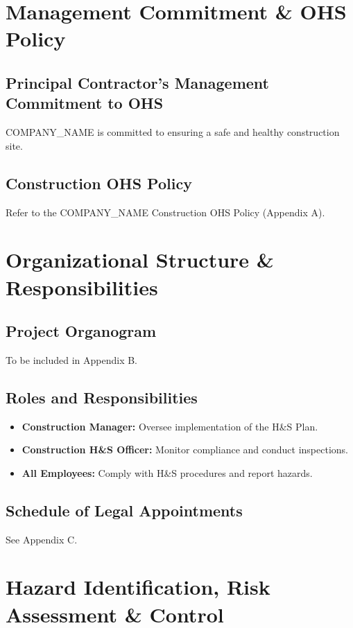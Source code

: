 \documentclass[12pt]{article}
\begin{document}
\section{Management Commitment \& OHS Policy}

\subsection{Principal Contractor's Management Commitment to OHS}
{{COMPANY_NAME}} is committed to ensuring a safe and healthy construction site.

\subsection{Construction OHS Policy}
Refer to the {{COMPANY_NAME}} Construction OHS Policy (Appendix A).

\section{Organizational Structure \& Responsibilities}

\subsection{Project Organogram}
To be included in Appendix B.

\subsection{Roles and Responsibilities}
\begin{itemize}
    \item \textbf{Construction Manager:} Oversee implementation of the H\&S Plan.
    \item \textbf{Construction H\&S Officer:} Monitor compliance and conduct inspections.
    \item \textbf{All Employees:} Comply with H\&S procedures and report hazards.
\end{itemize}

\subsection{Schedule of Legal Appointments}
See Appendix C.

\section{Hazard Identification, Risk Assessment \& Control}
\end{document}
